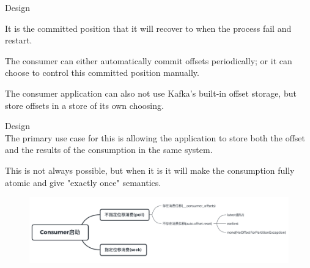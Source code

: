 \begin{frame}[plain,t]{Design} %
     \\
    \vspace{2ex}

    It is the committed position that it will recover to when  the process fail and restart.
    
    \vspace{2ex}
    The consumer can either automatically commit offsets periodically; or it can choose to control this committed position manually.
    
     \vspace{2ex}
     The consumer application can also not use Kafka's built-in offset storage, but store offsets in a store of its own choosing. 
    

\end{frame}
\begin{frame}[plain,t]{Design} %
     \\
    \vspace{2ex}
    The primary use case for this is allowing the application to store both the offset and the results of the consumption in the same system.
    
    \vspace{2ex}
    This is not always possible, but when it is it will make the consumption fully atomic and give "exactly once" semantics. 
    
    \vspace{2ex}
    \begin{figure}
        \centering
        \includegraphics[width=0.9\linewidth]{image/0217}
        \label{fig:0217}
    \end{figure}
    
\end{frame}



